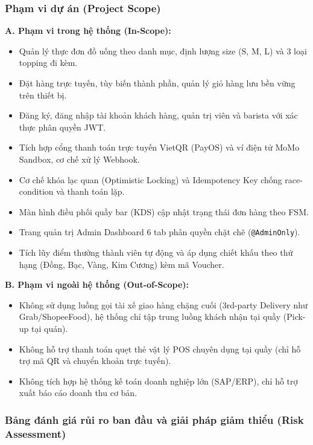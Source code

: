 \documentclass[11pt,a4paper]{article}
\begin{document}
\subsubsection{Phạm vi dự án (Project Scope)}
\textbf{A. Phạm vi trong hệ thống (In-Scope):}
\begin{itemize}[leftmargin=*]
    \item Quản lý thực đơn đồ uống theo danh mục, định lượng size (S, M, L) và 3 loại topping đi kèm.
    \item Đặt hàng trực tuyến, tùy biến thành phần, quản lý giỏ hàng lưu bền vững trên thiết bị.
    \item Đăng ký, đăng nhập tài khoản khách hàng, quản trị viên và barista với xác thực phân quyền JWT.
    \item Tích hợp cổng thanh toán trực tuyến VietQR (PayOS) và ví điện tử MoMo Sandbox, cơ chế xử lý Webhook.
    \item Cơ chế khóa lạc quan (Optimistic Locking) và Idempotency Key chống race-condition và thanh toán lặp.
    \item Màn hình điều phối quầy bar (KDS) cập nhật trạng thái đơn hàng theo FSM.
    \item Trang quản trị Admin Dashboard 6 tab phân quyền chặt chẽ (\texttt{@AdminOnly}).
    \item Tích lũy điểm thưởng thành viên tự động và áp dụng chiết khấu theo thứ hạng (Đồng, Bạc, Vàng, Kim Cương) kèm mã Voucher.
\end{itemize}
\clearpage

\textbf{B. Phạm vi ngoài hệ thống (Out-of-Scope):}
\begin{itemize}[leftmargin=*]
    \item Không sử dụng luồng gọi tài xế giao hàng chặng cuối (3rd-party Delivery như Grab/ShopeeFood), hệ thống chỉ tập trung luồng khách nhận tại quầy (Pick-up tại quán).
    \item Không hỗ trợ thanh toán quẹt thẻ vật lý POS chuyên dụng tại quầy (chỉ hỗ trợ mã QR và chuyển khoản trực tuyến).
    \item Không tích hợp hệ thống kế toán doanh nghiệp lớn (SAP/ERP), chỉ hỗ trợ xuất báo cáo doanh thu cơ bản.
\end{itemize}

\subsubsection{Bảng đánh giá rủi ro ban đầu và giải pháp giảm thiểu (Risk Assessment)}
\end{document}
